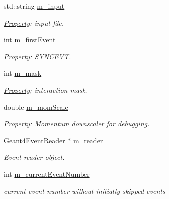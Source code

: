 \begin{DoxyCompactItemize}
\item 
std::string \hyperlink{class_d_d4hep_1_1_simulation_1_1_geant4_input_action_ac104781f934d0a6737dba78a2dfa6931}{m\_\-input}
\begin{DoxyCompactList}\small\item\em \hyperlink{class_d_d4hep_1_1_property}{Property}: input file. \item\end{DoxyCompactList}\item 
int \hyperlink{class_d_d4hep_1_1_simulation_1_1_geant4_input_action_a461a33c7eb46401092940394d40d99d7}{m\_\-firstEvent}
\begin{DoxyCompactList}\small\item\em \hyperlink{class_d_d4hep_1_1_property}{Property}: SYNCEVT. \item\end{DoxyCompactList}\item 
int \hyperlink{class_d_d4hep_1_1_simulation_1_1_geant4_input_action_a850fdde95d63db4a76929fbda7ccf35e}{m\_\-mask}
\begin{DoxyCompactList}\small\item\em \hyperlink{class_d_d4hep_1_1_property}{Property}; interaction mask. \item\end{DoxyCompactList}\item 
double \hyperlink{class_d_d4hep_1_1_simulation_1_1_geant4_input_action_a1227cac9486e4a389da69f7078b93637}{m\_\-momScale}
\begin{DoxyCompactList}\small\item\em \hyperlink{class_d_d4hep_1_1_property}{Property}: Momentum downscaler for debugging. \item\end{DoxyCompactList}\item 
\hyperlink{class_d_d4hep_1_1_simulation_1_1_geant4_event_reader}{Geant4EventReader} $\ast$ \hyperlink{class_d_d4hep_1_1_simulation_1_1_geant4_input_action_a68fd56256e10008e15de70d07797456c}{m\_\-reader}
\begin{DoxyCompactList}\small\item\em Event reader object. \item\end{DoxyCompactList}\item 
int \hyperlink{class_d_d4hep_1_1_simulation_1_1_geant4_input_action_a4b4cae1c79483e6f32ad70671984e422}{m\_\-currentEventNumber}
\begin{DoxyCompactList}\small\item\em current event number without initially skipped events \item\end{DoxyCompactList}\item 

\end{DoxyCompactItemize}
